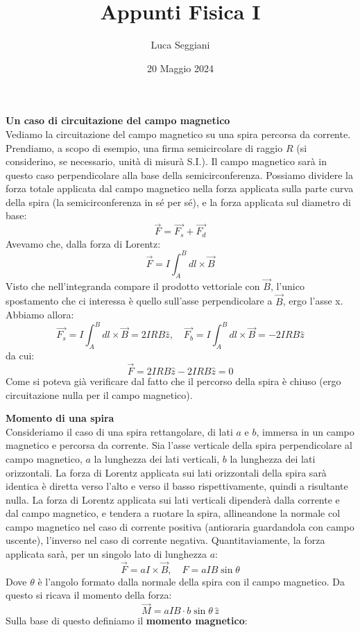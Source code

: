 \documentclass[a4paper,12pt]{article}
\title{Appunti Fisica I}
\author{Luca Seggiani}
\date{20 Maggio 2024}
\begin{document}
\maketitle
\par\smallskip
\textbf{Un caso di circuitazione del campo magnetico} \\
Vediamo la circuitazione del campo magnetico su una spira percorsa da corrente. Prendiamo, a scopo di esempio, 
una firma semicircolare di raggio $R$ (si considerino, se necessario, unità di misurà S.I.). Il campo
magnetico sarà in questo caso perpendicolare alla base della semicirconferenza. Possiamo dividere
la forza totale applicata dal campo magnetico nella forza applicata sulla parte curva della spira 
(la semicirconferenza in sé per sé), e la forza applicata sul diametro di base:
$$ \vec{F} = \vec{F_s} + \vec{F_d} $$
Avevamo che, dalla forza di Lorentz:
$$ \vec{F} = I\int_A^B dl \times \vec{B} $$
Visto che nell'integranda compare il prodotto vettoriale con $\vec{B}$, l'unico spostamento che ci interessa è
quello sull'asse perpendicolare a $\vec{B}$, ergo l'asse x. Abbiamo allora:
$$ \vec{F_s} = I\int_A^B dl \times \vec{B} = 2IRB\hat{z}, \quad \vec{F_b} = I\int_A^B dl \times \vec{B} = -2IRB\hat{z} $$
da cui:
$$ \vec{F} = 2IRB\hat{z} - 2IRB\hat{z} = 0 $$
Come si poteva già verificare dal fatto che il percorso della spira è chiuso (ergo circuitazione nulla per il campo magnetico).
\par\smallskip
\textbf{Momento di una spira} \\
Consideriamo il caso di una spira rettangolare, di lati $a$ e $b$, immersa in un campo magnetico e percorsa da corrente. Sia l'asse verticale della spira perpendicolare
al campo magnetico, $a$ la lunghezza dei lati verticali, $b$ la lunghezza dei lati orizzontali. La forza di Lorentz applicata sui lati
orizzontali della spira sarà identica è diretta verso l'alto e verso il basso rispettivamente, quindi a risultante nulla. La forza di Lorentz
applicata sui lati verticali dipenderà dalla corrente e dal campo magnetico, e tendera a ruotare la spira, allineandone la normale
col campo magnetico nel caso di corrente positiva (antioraria guardandola con campo uscente), l'inverso nel caso di corrente negativa.
Quantitaviamente, la forza applicata sarà, per un singolo lato di lunghezza $a$:
$$ \vec{F} = aI \times \vec{B}, \quad F = aIB\sin{\theta} $$
Dove $\theta$ è l'angolo formato dalla normale della spira con il campo magnetico. Da questo si ricava il momento della forza:
$$ \vec{M} = aIB \cdot b\sin{\theta} \, \hat{z} $$
Sulla base di questo definiamo il \textbf{momento magnetico}:
\end{document}
